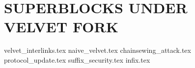 \chapter{SUPERBLOCKS UNDER VELVET FORK}

{velvet_interlinks.tex}
{naive_velvet.tex}
{chainsewing_attack.tex}
{protocol_update.tex}
{suffix_security.tex}
{infix.tex}